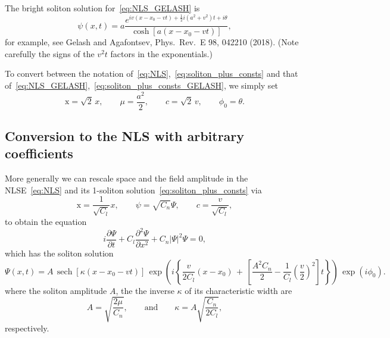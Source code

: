 \documentclass[11pt,a4paper]{article}
\DeclareMathOperator{\sech}{sech}
\begin{document}
The bright soliton solution for~\eqref{eq:NLS_GELASH} is
\begin{equation}
	\label{eq:soliton_plus_consts_GELASH}
	\psi(x ,t) = a \frac{e^{iv(x -x _0-vt) + \frac{1}{2}i(a^2+v^2)t + i\theta}}{\cosh\left[ a(x -x _0-vt) \right]},
\end{equation}
for example, see Gelash and  Agafontsev, Phys.\ Rev.\ E 98, 042210 (2018). (Note carefully the signs of the $v^2t$ factors in the exponentials.) 

To convert between the notation of~\eqref{eq:NLS},~\eqref{eq:soliton_plus_consts} and that of~\eqref{eq:NLS_GELASH},~\eqref{eq:soliton_plus_consts_GELASH}, we simply set
\begin{equation*}
	\mathrm{x} = \sqrt{2} \, x, 	\qquad 
	\mu= \frac{a^2}{2}, 		\qquad
	c=\sqrt{2} \, v,			\qquad
	\phi_0 = \theta.
\end{equation*}



\subsection{Conversion to the NLS with arbitrary coefficients}

More generally we can rescale space and the field amplitude in the NLSE~\eqref{eq:NLS} and its 1-soliton solution~\eqref{eq:soliton_plus_consts} via
\begin{equation*}
	\mathrm{x}     = \frac{1}{\sqrt{C_l}} x , \qquad
	\psi = \sqrt{C_n} \Psi, \qquad
	c     = \frac{v}{\sqrt{C_l}},
\end{equation*}
to obtain the equation
\begin{equation*}
	i\frac{\partial\Psi}{\partial t} + C_l \frac{\partial^2 \Psi}{\partial x ^2} + C_n |\Psi|^2 \Psi =0,
\end{equation*}
which has the soliton solution
\begin{equation*}
	\Psi(x ,t) = 
				A  \,
	 			\sech\!\left[  \kappa (x -x _0-vt)  \right]  \, 
	 			\exp\!\left(i \left\{  \frac{v}{2C_l} (x -x _0)  \,+ \, \left[ \frac{A^2C_n}{2}  -  \frac{1}{C_l} \left( \frac{v}{2}\right)^2 \right]t \right\} \right)\, 
	 			\exp(i\phi_0).
\end{equation*}
where the soliton amplitude $A$, the the inverse $\kappa$ of its characteristic width are
\begin{equation*}
	A = \sqrt{\frac{2\mu}{C_n}}, \qquad \mathrm{and} \qquad
	\kappa = A\sqrt{\frac{C_n}{2C_l}},
\end{equation*}
respectively.
\end{document}
